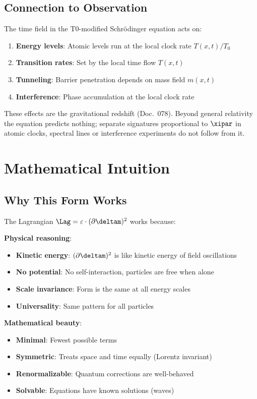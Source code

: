 	\subsection{Connection to Observation}
	
	The time field in the T0-modified Schrödinger equation acts on:
	
	\begin{enumerate}
		\item \textbf{Energy levels}: Atomic levels run at the local clock rate $T(x,t)/T_0$
		\item \textbf{Transition rates}: Set by the local time flow $T(x,t)$
		\item \textbf{Tunneling}: Barrier penetration depends on mass field $m(x,t)$
		\item \textbf{Interference}: Phase accumulation at the local clock rate
	\end{enumerate}
	
	These effects are the gravitational redshift (Doc.~078). Beyond general relativity the equation predicts nothing; separate signatures proportional to $\xipar$ in atomic clocks, spectral lines or interference experiments do not follow from it.

	\section{Mathematical Intuition}
	
	\subsection{Why This Form Works}
	
	The Lagrangian $\Lag = \varepsilon \cdot (\partial \deltam)^2$ works because:
	
	\textbf{Physical reasoning}:
	\begin{itemize}
		\item \textbf{Kinetic energy}: $(\partial \deltam)^2$ is like kinetic energy of field oscillations
		\item \textbf{No potential}: No self-interaction, particles are free when alone
		\item \textbf{Scale invariance}: Form is the same at all energy scales
		\item \textbf{Universality}: Same pattern for all particles
	\end{itemize}
	
	\textbf{Mathematical beauty}:
	\begin{itemize}
		\item \textbf{Minimal}: Fewest possible terms
		\item \textbf{Symmetric}: Treats space and time equally (Lorentz invariant)
		\item \textbf{Renormalizable}: Quantum corrections are well-behaved
		\item \textbf{Solvable}: Equations have known solutions (waves)
	\end{itemize}
	
